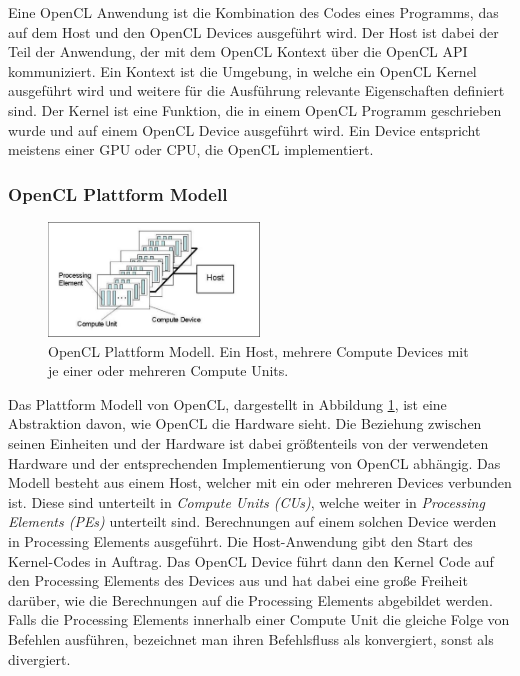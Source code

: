 Eine OpenCL Anwendung ist die Kombination des Codes eines Programms, das auf dem Host und den OpenCL Devices ausgeführt wird.
Der Host ist dabei der Teil der Anwendung, der mit dem OpenCL Kontext über die OpenCL API kommuniziert.
Ein Kontext ist die Umgebung, in welche ein OpenCL Kernel ausgeführt wird und weitere für die Ausführung relevante Eigenschaften definiert sind.
Der Kernel ist eine Funktion, die in einem OpenCL Programm geschrieben wurde und auf einem OpenCL Device ausgeführt wird.
Ein Device entspricht meistens einer GPU oder CPU, die OpenCL implementiert.

\subsubsection*{OpenCL Plattform Modell}
\begin{figure}
	\centering
	\includegraphics[width=0.5\textwidth]{../../Grafiken/OpenCL_PlatformModel.png}
	\caption{OpenCL Plattform Modell. Ein Host, mehrere Compute Devices mit je einer oder mehreren Compute Units. \cite{OCLSPC}}
	\label{fig::ga02}
\end{figure}
Das Plattform Modell von OpenCL, dargestellt in Abbildung \ref{fig::ga02}, ist eine Abstraktion davon, wie OpenCL die Hardware sieht.
Die Beziehung zwischen seinen Einheiten und der Hardware ist dabei größtenteils von der verwendeten Hardware und der entsprechenden Implementierung von OpenCL abhängig.
Das Modell besteht aus einem Host, welcher mit ein oder mehreren Devices verbunden ist.
Diese sind unterteilt in \emph{Compute Units (CUs)}, welche weiter in \emph{Processing Elements (PEs)} unterteilt sind.
Berechnungen auf einem solchen Device werden in Processing Elements ausgeführt.
Die Host-Anwendung gibt den Start des Kernel-Codes in Auftrag.
Das OpenCL Device führt dann den Kernel Code auf den Processing Elements des Devices aus und hat dabei eine große Freiheit darüber, wie die Berechnungen auf die Processing Elements abgebildet werden.
Falls die Processing Elements innerhalb einer Compute Unit die gleiche Folge von Befehlen ausführen, bezeichnet man ihren Befehlsfluss als konvergiert, sonst als divergiert.


